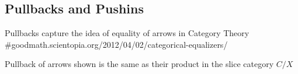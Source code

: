 \documentclass[../../notes.tex]{subfiles}
\begin{document}
\subsection{Pullbacks and Pushins}

Pullbacks capture the idea of equality of arrows in Category Theory
#goodmath.scientopia.org/2012/04/02/categorical-equalizers/
Pullback of arrows shown is the same as their product in the slice category $C/X$
\end{document}
